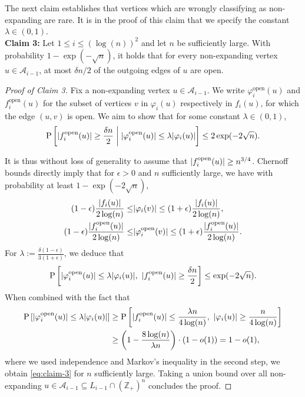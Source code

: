 \documentclass[11pt]{article}
\renewcommand{\P}{\mathrm{P}}
\newcommand{\Z}{\mathbb{Z}}
\newcommand{\A}{\mathcal{A}}
\DeclarePairedDelimiter{\abs}{\lvert}{\rvert}
\theoremstyle{remark}
\begin{document}
The next claim establishes that vertices which are wrongly classifying as non-expanding are rare. It is in the proof of this claim that we specify the constant $\lambda \in (0,1)$.\\

\textbf{Claim 3:} Let $1 \le i \le (\log(n))^2$ and let $n$ be sufficiently large. With probability $1- \exp(-\sqrt{n})$, it holds that for every non-expanding vertex $u \in \A_{i-1}$, at most $\delta n / 2$ of the outgoing edges of $u$ are open.
\begin{proof}[Proof of Claim 3]
    Fix a non-expanding vertex $u \in \A_{i-1}$. We write  $\varphi_i^\text{open}(u)$ and $f_i^\text{open}(u)$ for the subset of vertices $v$ in $\varphi_i(u)$ respectively in $f_i(u)$, for which the edge $(u,v)$ is open. We aim to show that for some constant $\lambda \in (0,1)$,
    \begin{equation}\label{eq:claim-3}
        \P\left[ \abs{f_i^\text{open}(u)} \ge \frac{\delta n}{2} \biggm| \abs{\varphi_i^\text{open}(u)} \le \lambda \abs{\varphi_i(u)} \right] \le 2\exp(-2\sqrt{n}).
    \end{equation}
    
    It is thus without loss of generality to assume that $\abs{f_i^\text{open}(u)} \ge n^{3/4}$. Chernoff bounds directly imply that for $\epsilon>0$ and $n$ sufficiently large, we have with probability at least $1 - \exp(-2\sqrt{n})$, 
    \begin{align*}
        (1 - \epsilon)\frac{\abs{f_i(u)}}{2 \log(n)}  \leq &\abs{\varphi_i(v)} \leq (1+\epsilon)\frac{\abs{f_i(u)}}{2 \log(n)}, \\
        (1-\epsilon)\frac{\abs{f_i^\text{open}(u)}}{2 \log(n)} \leq &\abs{\varphi^\text{open}_i(v)} \leq (1+\epsilon)\frac{\abs{f_i^\text{open}(u)}}{2 \log(n)}.
    \end{align*}
    For $\lambda := \frac{\delta(1-\epsilon)}{3(1+\epsilon)}$, we deduce that
    \begin{equation}
        \P\left[ \abs{\varphi_i^\text{open}(u)} \le \lambda \abs{\varphi_i(u)},\  \abs{f_i^\text{open}(u)} \ge \frac{\delta n}{2} \right]
        \le  \exp(-2\sqrt{n}).
    \end{equation}
    When combined with the fact that 
    \begin{align*}
        \P\left[ \abs{\varphi_i^\text{open}(u)} \le \lambda \abs{\varphi_i(u)} \right] &\ge \P\left[  \abs{f_i^\text{open}(u)} \le \frac{\lambda n}{4\log(n)},\ \abs{\varphi_i(u)} \geq \frac{n}{4\log(n)}\right] \\
        &\ge    \left(1-\frac{8\log(n)}{\lambda n}\right) \cdot \left(1 - o(1)\right) = 1 - o(1),
    \end{align*}
    where we used independence and Markov's inequality in the second step, we obtain \eqref{eq:claim-3} for $n$ sufficiently large. Taking a union bound over all non-expanding $u \in \A_{i-1} \subseteq L_{i-1} \cap (\Z_+)^n$ concludes the proof.
\end{proof}
\end{document}
